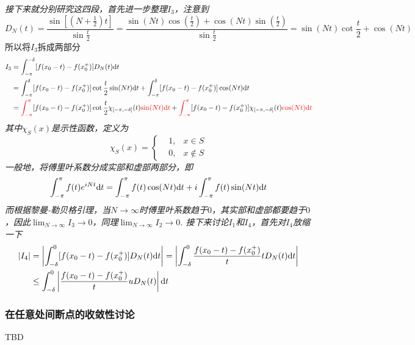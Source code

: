 \documentclass[main.tex]{subfiles}
\begin{document}
\textit{接下来就分别研究这四段，首先进一步整理\(I_3\)，注意到}
\[D_N(t) = \frac{\sin[(N+\frac{1}{2})t]}{\sin\frac{t}{2}} = \frac{\sin(Nt)\cos(\frac{t}{2})+\cos(Nt)\sin(\frac{t}{2})}{\sin\frac{t}{2}} = \sin(Nt)\cot\frac{t}{2}+\cos(Nt)\]
所以将\(I_3\)拆成两部分
\begin{align*}
    I_3 &= \int_{-\pi}^{-\delta}[f(x_0-t)-f(x_0^+)]D_N(t){\rm d}t \\
    &= \int_{-\pi}^{\delta}[f(x_0-t)-f(x_0^+)]\cot\frac{t}{2}\sin(Nt){\rm d}t + \int_{-\pi}^{\delta}[f(x_0-t)-f(x_0^+)]\cos(Nt){\rm d}t \\
    &= {\color{red}\int_{-\pi}^{\pi}}[f(x_0-t)-f(x_0^+)]\cot\frac{t}{2}\chi_{[-\pi,-\delta]}(t){\color{red}\sin(Nt){\rm d}t} + {\color{red} \int_{-\pi}^{\pi}}[f(x_0-t)-f(x_0^+)]\chi_{[-\pi,-\delta]}(t){\color{red}\cos(Nt){\rm d}t}
\end{align*}
\textit{其中\(\chi_S(x)\)是示性函数，定义为}
\[\chi_S(x) = \left\{\begin{aligned} & 1, & x \in S \\ & 0, &x \not\in S \end{aligned}\right.\]
\textit{
    一般地，将傅里叶系数分成实部和虚部两部分，即
    \[\int_{-\pi}^{\pi}f(t)e^{iNt}{\rm d}t = \int_{-\pi}^{\pi}f(t)\cos(Nt){\rm d}t + i\int_{-\pi}^{\pi}f(t)\sin(Nt){\rm d}t\]
    而根据黎曼-勒贝格引理，当\(N\to\infty\)时傅里叶系数趋于\(0\)，其实部和虚部都要趋于\(0\)，因此\(\displaystyle{\lim_{N\to\infty}I_3 \to 0}\)，同理\(\displaystyle{\lim_{N\to\infty}I_2 \to 0}\).
    接下来讨论\(I_1\)和\(I_4\)，首先对\(I_4\)放缩一下
}
\begin{align*}
    |I_4| &= \left|\int_{-\delta}^{0}[f(x_0-t)-f(x_0^+)]D_N(t){\rm d}t\right| = \left|\int_{-\delta}^{0}\frac{f(x_0-t)-f(x_0^+)}{t}tD_N(t){\rm d}t\right| \\
        &\leq \int_{-\delta}^{0}\left|\frac{f(x_0-t)-f(x_0^+)}{t}uD_N(t)\right|{\rm d}t
\end{align*}

\subsubsection{在任意处间断点的收敛性讨论}

TBD
\end{document}
